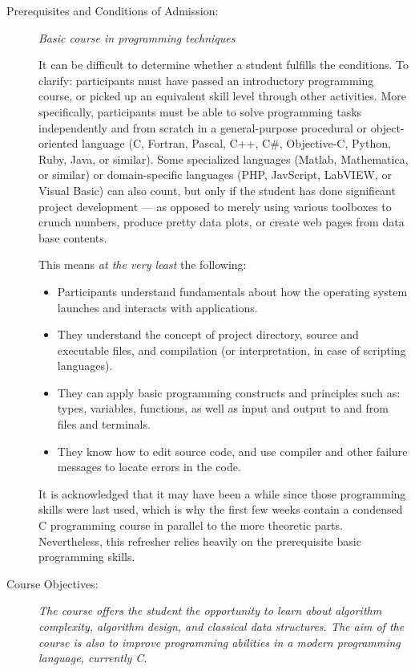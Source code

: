 \documentclass[a4paper]{article}
\begin{document}
\begin{description}

\item[Prerequisites and Conditions of Admission:]
  \emph{Basic course in programming techniques}

  It can be difficult to determine whether a student fulfills the conditions.
  To clarify: participants must have passed an introductory programming course, or picked up an equivalent skill level through other activities.
  More specifically, participants must be able to solve programming tasks independently and from scratch in a general-purpose procedural or object-oriented language (C, Fortran, Pascal, C++, C\#, Objective-C, Python, Ruby, Java, or similar).
  Some specialized languages (Matlab, Mathematica, or similar) or domain-specific languages (PHP, JavScript, LabVIEW, or Visual Basic) can also count, but only if the student has done significant project development --- as opposed to merely using various toolboxes to crunch numbers, produce pretty data plots, or create web pages from data base contents.

  This means \emph{at the very least} the following:
  
  \begin{itemize}
  \item Participants understand fundamentals about how the operating system launches and interacts with applications.
  \item They understand the concept of project directory, source and executable files, and compilation (or interpretation, in case of scripting languages).
  \item They can apply basic programming constructs and principles such as: types, variables, functions, as well as input and output to and from files and terminals.
  \item They know how to edit source code, and use compiler and other failure messages to locate errors in the code.
  \end{itemize}
  
  It is acknowledged that it may have been a while since those programming skills were last used, which is why the first few weeks contain a condensed C programming course in parallel to the more theoretic parts.
  Nevertheless, this refresher relies heavily on the prerequisite basic programming skills.

\item[Course Objectives:]
  \emph{
    The course offers the student the opportunity to learn about algorithm complexity, algorithm design, and classical data structures.
    The aim of the course is also to improve programming abilities in a modern programming language, currently C.
  }
  

\end{description}
\end{document}
